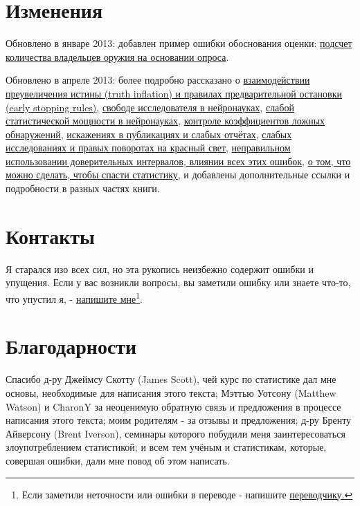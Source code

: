 \section{Изменения}
\label{chp1:changes}

Обновлено в январе 2013: добавлен пример ошибки обоснования оценки: \hyperref[chp5:arms-baserateF]{подсчет количества владельцев оружия на основании опроса}.  

Обновлено в апреле 2013: более подробно рассказано о \hyperref[chp7:truthinflation]{взаимодействии преувеличения истины (truth inflation) и правилах предварительной остановки (early stopping rules)}, \hyperref[chp5:redherrings]{свободе исследователя в нейронауках}, \hyperref[chp3:powerunderpowered]{слабой статистической мощности в нейронауках}, \hyperref[chp5:controlfalserate]{контроле коэффициентов ложных обнаружений}, \hyperref[chp10]{искажениях в публикациях и слабых отчётах}, \hyperref[chp3:wrongturnred]{слабых исследованиях и правых поворотах на красный свет}, \hyperref[chp6:significantdiffmissed]{неправильном использовании доверительных интервалов},\hyperref[chp11]{
влиянии всех этих ошибок}, \hyperref[chp12]{о том, что можно сделать, чтобы спасти статистику}, и добавлены дополнительные ссылки и подробности в разных частях книги.


\section{Контакты}
\label{chp1:contact}

Я старался изо всех сил, но эта рукопись неизбежно содержит ошибки и упущения. Если у вас возникли вопросы, вы заметили ошибку или знаете что-то, что упустил я, - \href{mailto:alex@refsmmat.com}{напишите мне}\footnote{Если заметили неточности или ошибки в переводе - напишите \href{https://github.com/cellahchain/statisticsdonewrong}{переводчику.}}.

\section{Благодарности}
\label{chp1:acknow}

Спасибо д-ру Джеймсу Скотту (James Scott), чей курс по статистике дал мне основы, необходимые для написания этого текста; Мэттью Уотсону (Matthew Watson) и CharonY за неоценимую обратную связь и предложения в процессе написания этого текста; моим родителям - за отзывы и предложения; д-ру Бренту Айверсону (Brent Iverson), семинары которого побудили меня заинтересоваться злоупотреблением статистикой; и всем тем учёным и статистикам, которые, совершая ошибки, дали мне повод об этом написать.

